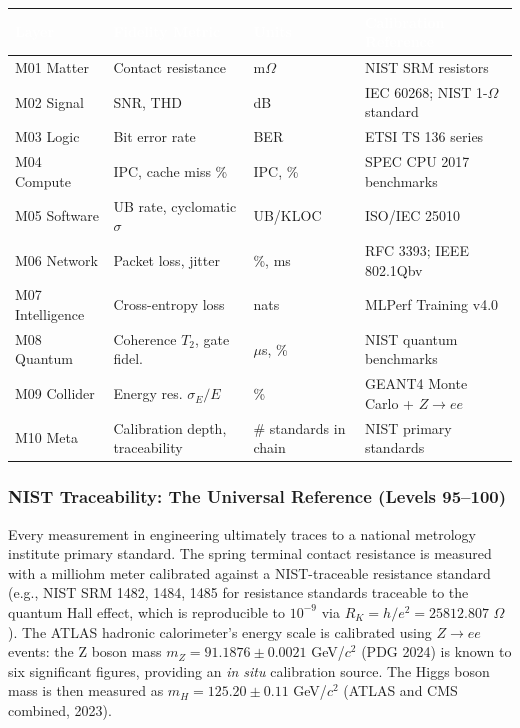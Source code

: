 \documentclass[11pt,letterpaper]{article}
\newcommand{\tableheader}[1]{\textbf{\sffamily\textcolor{white}{#1}}}
\begin{document}
\begin{center}
\begin{tabularx}{\textwidth}{L{1.8cm}L{2.8cm}L{2.5cm}X}
\toprule
{}
\tableheader{Layer} & \tableheader{Fidelity Metric} & \tableheader{Units} & \tableheader{Calibration Reference} \\
\midrule
M01 Matter & Contact resistance & m$\Omega$ & NIST SRM resistors \\
M02 Signal & SNR, THD & dB & IEC 60268; NIST 1-$\Omega$ standard \\
M03 Logic & Bit error rate & BER & ETSI TS 136 series \\
M04 Compute & IPC, cache miss \% & IPC, \% & SPEC CPU 2017 benchmarks \\
M05 Software & UB rate, cyclomatic $\sigma$ & UB/KLOC & ISO/IEC 25010 \\
M06 Network & Packet loss, jitter & \%, ms & RFC 3393; IEEE 802.1Qbv \\
M07 Intelligence & Cross-entropy loss & nats & MLPerf Training v4.0 \\
M08 Quantum & Coherence $T_2$, gate fidel. & $\mu$s, \% & NIST quantum benchmarks \\
M09 Collider & Energy res. $\sigma_E/E$ & \% & GEANT4 Monte Carlo + $Z \rightarrow ee$ \\
M10 Meta & Calibration depth, traceability & \# standards in chain & NIST primary standards \\
\bottomrule
\end{tabularx}
\end{center}

\subsubsection{NIST Traceability: The Universal Reference (Levels 95--100)}

Every measurement in engineering ultimately traces to a national metrology institute primary
standard. The spring terminal contact resistance is measured with a milliohm meter calibrated
against a NIST-traceable resistance standard (e.g., NIST SRM 1482, 1484, 1485 for resistance
standards traceable to the quantum Hall effect, which is reproducible to $10^{-9}$ via
$R_K = h/e^2 = 25812.807$ $\Omega$). The ATLAS hadronic calorimeter's energy scale is calibrated
using $Z \rightarrow ee$ events: the Z boson mass $m_Z = 91.1876 \pm 0.0021$ GeV/$c^2$ (PDG 2024)
is known to six significant figures, providing an \textit{in situ} calibration source. The Higgs
boson mass is then measured as $m_H = 125.20 \pm 0.11$ GeV/$c^2$ (ATLAS and CMS combined, 2023).
\end{document}
